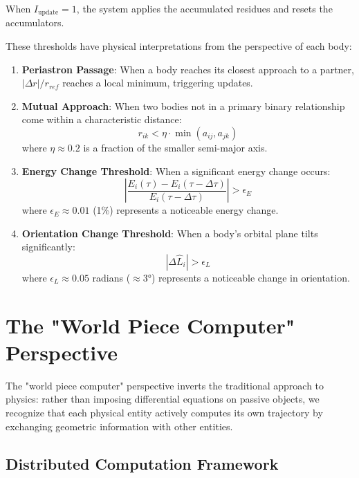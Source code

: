 \documentclass{article}
\begin{document}
When $I_{\text{update}} = 1$, the system applies the accumulated residues and resets the accumulators.

These thresholds have physical interpretations from the perspective of each body:

\begin{enumerate}
\item \textbf{Periastron Passage}: When a body reaches its closest approach to a partner, $|\Delta r|/r_{ref}$ reaches a local minimum, triggering updates.

\item \textbf{Mutual Approach}: When two bodies not in a primary binary relationship come within a characteristic distance:
\begin{equation}
r_{ik} < \eta \cdot \min(a_{ij}, a_{jk})
\end{equation}
where $\eta \approx 0.2$ is a fraction of the smaller semi-major axis.

\item \textbf{Energy Change Threshold}: When a significant energy change occurs:
\begin{equation}
\left|\frac{E_i(\tau) - E_i(\tau-\Delta\tau)}{E_i(\tau-\Delta\tau)}\right| > \epsilon_E
\end{equation}
where $\epsilon_E \approx 0.01$ (1\%) represents a noticeable energy change.

\item \textbf{Orientation Change Threshold}: When a body's orbital plane tilts significantly:
\begin{equation}
|\Delta\hat{L}_i| > \epsilon_L
\end{equation}
where $\epsilon_L \approx 0.05$ radians ($\approx 3°$) represents a noticeable change in orientation.
\end{enumerate}

\section{The "World Piece Computer" Perspective}

The "world piece computer" perspective inverts the traditional approach to physics: rather than imposing differential equations on passive objects, we recognize that each physical entity actively computes its own trajectory by exchanging geometric information with other entities.

\subsection{Distributed Computation Framework}
\end{document}
